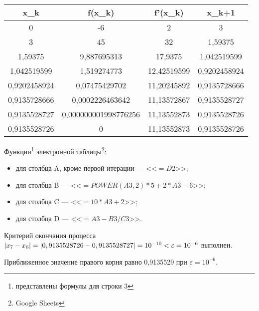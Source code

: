 \documentclass[10pt, a4paper, titlepage]{article}
\newcommand*{\hm}[1]{#1\nobreak\discretionary{}{\hbox{$\mathsurround=0pt #1$}}{}} %
\begin{document}
\begin{center}
    \begin{tabular}{|*{4}{C|}}
        \hline
        x_k & f(x_k) & f'(x_k) & x_{k+1} \\ \hline
        
        0 & -6 & 2 & 3 \\ \hline
        
        3 &	45 & 32 & 1,59375 \\ \hline
        
        1,59375	& 9,887695313 &	17,9375 & 1,042519599 \\ \hline
        
        1,042519599 & 1,519274773 & 12,42519599 & 0,9202458924 \\ \hline
        
        0,9202458924 & 0,07475429702 & 11,20245892 & 0,9135728666 \\ \hline
        
        0,9135728666 & 0,0002226463642 & 11,13572867 & 0,9135528727 \\ \hline
        
        0,9135528727 & 0,000000001998776256	& 11,13552873 & 0,9135528726 \\ \hline
        
        0,9135528726 & 0 & 11,13552873 & 0,9135528726 \\ \hline
        
    \end{tabular}
\end{center}

Функции\footnote{представлены формулы для строки 3} электронной таблицы\footnote{Google Sheets}:
\begin{itemize}
    \item для столбца A, кроме первой итерации --- <<$=D2$>>;
    
    \item для столбца B --- <<$=POWER(A3, 2)*5+2*A3-6$>>;
    
    \item для столбца C --- <<$=10*A3+2$>>;
    
    \item для столбца D --- <<$=A3-B3/C3$>>.
\end{itemize}

Критерий окончания процесса $|x_7-x_6|=|0,9135528726-0,9135528727| \hm =10^{-10}<\varepsilon=10^{-6}$ выполнен. 

Приближенное значение правого корня равно 0,9135529 при $\varepsilon=10^{-6}$.
\end{document}
